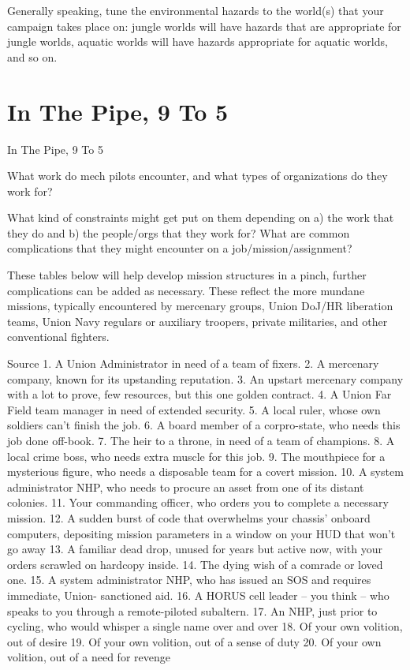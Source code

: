 Generally speaking, tune the environmental hazards to the world(s) that your campaign takes
place on: jungle worlds will have hazards that are appropriate for jungle worlds, aquatic worlds
will have hazards appropriate for aquatic worlds, and so on.



\section{In The Pipe, 9 To 5 }

In The Pipe, 9 To 5

What work do mech pilots encounter, and what types of organizations do they work for?

What kind of constraints might get put on them depending on a) the work that they do and b) the
people/orgs that they work for? What are common complications that they might encounter on a
job/mission/assignment?

These tables below will help develop mission structures in a pinch, further complications can be
added as necessary. These reflect the more mundane missions, typically encountered by
mercenary groups, Union DoJ/HR liberation teams, Union Navy regulars or auxiliary troopers,
private militaries, and other conventional fighters.

Source
    1.  A Union Administrator in need of a team of fixers.
    2.  A mercenary company, known for its upstanding reputation.
    3.  An upstart mercenary company with a lot to prove, few resources, but this one golden
        contract.
    4.  A Union Far Field team manager in need of extended security.
    5.  A local ruler, whose own soldiers can’t finish the job.
    6.  A board member of a corpro-state, who needs this job done off-book.
    7.  The heir to a throne, in need of a team of champions.
    8.  A local crime boss, who needs extra muscle for this job.
    9.  The mouthpiece for a mysterious figure, who needs a disposable team for a covert
        mission.
    10. A system administrator NHP, who needs to procure an asset from one of its distant
        colonies.
    11. Your commanding officer, who orders you to complete a necessary mission.
    12. A sudden burst of code that overwhelms your chassis’ onboard computers, depositing
        mission parameters in a window on your HUD that won’t go away
    13. A familiar dead drop, unused for years but active now, with your orders scrawled on
        hardcopy inside.
    14. The dying wish of a comrade or loved one.
    15. A system administrator NHP, who has issued an SOS and requires immediate, Union-
        sanctioned aid.
    16. A HORUS cell leader -- you think -- who speaks to you through a remote-piloted subaltern.
    17. An NHP, just prior to cycling, who would whisper a single name over and over
    18. Of your own volition, out of desire
    19. Of your own volition, out of a sense of duty
    20. Of your own volition, out of a need for revenge

